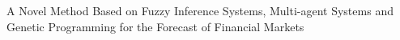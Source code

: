 A Novel Method Based on Fuzzy Inference Systems, Multi-agent Systems and Genetic Programming for the Forecast of Financial Markets
    
    
  
  
  
  
  
  